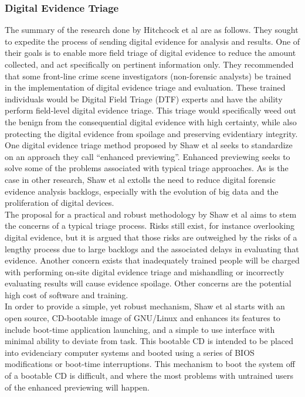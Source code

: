 \documentclass[12pt]{article}
\begin{document}
\subsubsection{Digital Evidence Triage}
The summary of the research done by Hitchcock et al\cite{hitchcock2016tiered} are as follows.  They sought to expedite
the process of sending digital evidence for analysis and results.  One of their goals is to enable more field triage
of digital evidence to reduce the amount collected, and act specifically on pertinent information only.  They 
recommended that some front-line crime scene investigators (non-forensic analysts) be trained in the implementation
of digital evidence triage and evaluation.  These trained individuals would be Digital Field Triage (DTF) experts and
have the ability perform field-level digital evidence triage.  This triage would specifically weed out the benign
from the consequential digital evidence with high certainty, while also protecting the digital evidence from spoilage
and preserving evidentiary integrity.\\

One digital evidence triage method proposed by Shaw et al\cite{shaw2013practical} seeks to standardize on an 
approach they call ``enhanced previewing''.  Enhanced previewing seeks to solve some of the problems associated with
typical triage approaches.  As is the case in other research, Shaw et al\cite{shaw2013practical} extolls the 
need to reduce digital forensic evidence analysis backlogs, especially with the evolution of big data and the
proliferation of digital devices.\\

The proposal for a practical and robust methodology by Shaw et al\cite{shaw2013practical} aims to stem the concerns
of a typical triage process.  Risks still exist, for instance overlooking digital evidence, but it is argued that
those risks are outweighed by the risks of a lengthy process due to large backlogs and the associated delays in
evaluating that evidence.  Another concern exists that inadequately trained people will be charged with performing
on-site digital evidence triage and mishandling or incorrectly evaluating results will cause evidence spoilage.
Other concerns are the potential high cost of software and training.\\

In order to provide a simple, yet robust mechanism, Shaw et al\cite{shaw2013practical} starts with an open source,
CD-bootable image of GNU/Linux and enhances its features to include boot-time application launching, and a simple
to use interface with minimal ability to deviate from task.  This bootable CD is intended to be placed into 
evidenciary computer systems and booted using a series of BIOS modifications or boot-time interruptions.  This 
mechanism to boot the system off of a bootable CD is difficult, and where the most problems with untrained users
of the enhanced previewing will happen.\\
\end{document}
